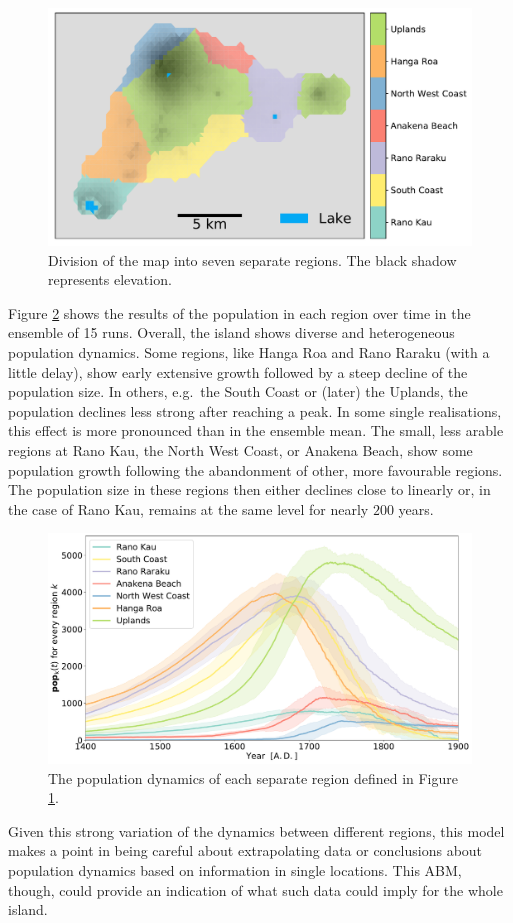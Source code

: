 \begin{figure}
	\centering
	\includegraphics[width=1.0\linewidth]{images/Results/Standard/MapRegionsCoarse}
	\caption{Division of the map into seven separate regions. The black shadow represents elevation.}
	\label{fig:mapregionscoarse}
\end{figure}
Figure \ref{fig:regionalstats} shows the results of the population in each region over time in the ensemble of 15 runs.
Overall, the island shows diverse and heterogeneous population dynamics. 
Some regions, like Hanga Roa and Rano Raraku (with a little delay), show early extensive growth followed by a steep decline of the population size.
In others, e.g.\ the South Coast or (later) the Uplands, the population declines less strong after reaching a peak.
In some single realisations, this effect is more pronounced than in the ensemble mean.
The small, less arable regions at Rano Kau, the North West Coast, or Anakena Beach, show some population growth following the abandonment of other, more favourable regions.
The population size in these regions then either declines close to linearly or, in the case of Rano Kau, remains at the same level for nearly $200$ years.
\begin{figure}
	\centering
	\includegraphics[width=1.0\linewidth]{images/Results/Standard/RegionalStatsEnsembleOnly}
	\caption{The population dynamics of each separate region defined in Figure \ref{fig:mapregionscoarse}.}
	\label{fig:regionalstats}
\end{figure}
Given this strong variation of the dynamics between different regions, this model makes a point in being careful about extrapolating data or conclusions about population dynamics based on information in single locations.
This ABM, though, could provide an indication of what such data could imply for the whole island.

